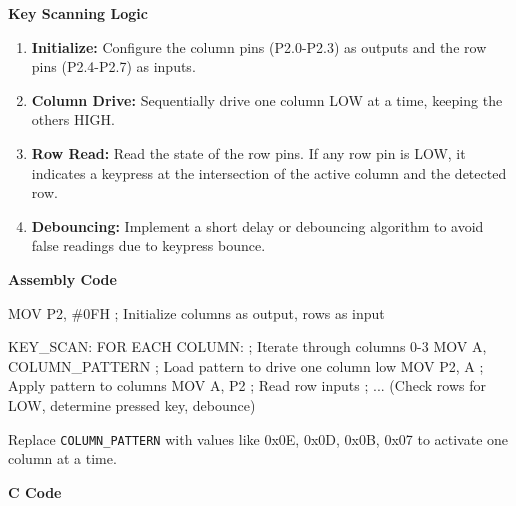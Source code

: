 \documentclass[
]{article}
\newenvironment{Shaded}{}{}
\newcommand{\NormalTok}[1]{#1}
\begin{document}
\textbf{Key Scanning Logic}

\begin{enumerate}
\def\labelenumi{\arabic{enumi}.}
\item
  \textbf{Initialize:} Configure the column pins (P2.0-P2.3) as outputs
  and the row pins (P2.4-P2.7) as inputs.
\item
  \textbf{Column Drive:} Sequentially drive one column LOW at a time,
  keeping the others HIGH.
\item
  \textbf{Row Read:} Read the state of the row pins. If any row pin is
  LOW, it indicates a keypress at the intersection of the active column
  and the detected row.
\item
  \textbf{Debouncing:} Implement a short delay or debouncing algorithm
  to avoid false readings due to keypress bounce.
\end{enumerate}

\textbf{Assembly Code}

\begin{Shaded}
\begin{Highlighting}[]
\NormalTok{MOV P2, \#0FH     ; Initialize columns as output, rows as input}

\NormalTok{KEY\_SCAN:}
\NormalTok{    FOR EACH COLUMN:  ; Iterate through columns 0{-}3}
\NormalTok{        MOV A, COLUMN\_PATTERN ; Load pattern to drive one column low}
\NormalTok{        MOV P2, A             ; Apply pattern to columns}
\NormalTok{        MOV A, P2             ; Read row inputs}
\NormalTok{        ; ... (Check rows for LOW, determine pressed key, debounce)}
\end{Highlighting}
\end{Shaded}

Replace \texttt{COLUMN\_PATTERN} with values like 0x0E, 0x0D, 0x0B, 0x07
to activate one column at a time.

\textbf{C Code}
\end{document}

